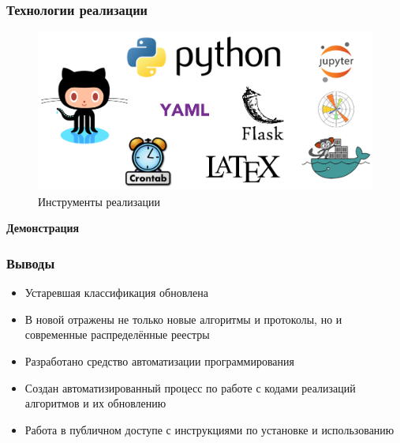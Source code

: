 \documentclass{beamer}
\begin{document}
\begin{frame}
    \frametitle{Технологии реализации}
    \begin{figure}
        \includegraphics[width=\columnwidth]{tech.png}
        \caption{\small Инструменты реализации}
    \end{figure}
\end{frame}

\begin{frame}
    \centering
    \LARGE \bfseries \color{white}
    Демонстрация
\end{frame}

\begin{frame}
    \frametitle{Выводы}
    \begin{itemize}
        \item[\checkmark] Устаревшая классификация обновлена
        \item[\checkmark] В новой отражены не только новые алгоритмы и
                          протоколы, но и современные распределённые реестры
        \item[\checkmark] Разработано средство автоматизации программирования
        \item[\checkmark] Создан автоматизированный процесс по работе с кодами
                          реализаций алгоритмов и их обновлению
        \item[\checkmark] Работа в публичном доступе с инструкциями по
                          установке и использованию
    \end{itemize}
\end{frame}
\end{document}
